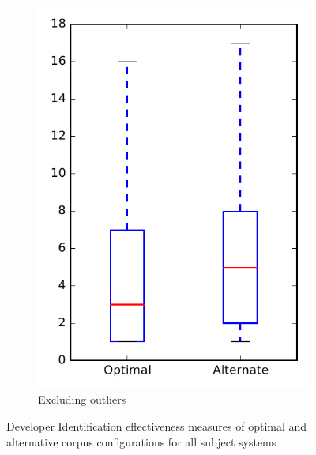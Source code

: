 \begin{figure}
\begin{subfigure}{.4\textwidth}
        \includegraphics[height=0.4\textheight]{figures/combo/dit_rq2_overview_no_outlier}
        \caption{Excluding outliers}\label{fig:combo:dit:rq2:overview_no_outlier}
    \end{subfigure}
\caption{Developer Identification effectiveness measures of optimal and alternative corpus configurations for all subject systems}
\label{fig:combo:dit:rq2:overview}
\end{figure}

